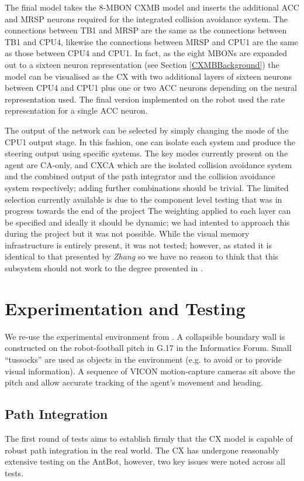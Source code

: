 \documentclass[a4paper,11pt,twoside,openright]{article}
\let\oldsection\section
\def\section{\cleardoublepage\oldsection}
\begin{document}
The final model takes the 8-MBON CXMB model and inserts the additional ACC and
MRSP neurons required for the integrated collision avoidance system. The
connections between TB1 and MRSP are the same as the connections between TB1
and CPU4, likewise the connections between MRSP and CPU1 are the same as those
between CPU4 and CPU1. In fact, as the eight MBONs are expanded out to a
sixteen neuron representation (see Section \ref{CXMBBackground}) the
model can be visualised as the CX with two additional layers of sixteen neurons
between CPU4 and CPU1 plus one or two ACC neurons depending on the neural
representation used. The final version implemented on the robot used the rate
representation for a single ACC neuron.
\newline\par

The output of the network can be selected by simply changing the mode of the
CPU1 output stage. In this fashion, one can isolate each system and produce
the steering output using specific systems. The key modes currently present on
the agent are CA-only, and CXCA which are the isolated collision avoidance system
and the combined output of the path integrator and the collision avoidance
system respectively; adding further combinations should be trivial. The limited
selection currently available is due to the component level testing that
was in progress towards the end of the project The weighting applied to each
layer can be specified and ideally it should be dynamic; we had intented to
approach this during the project but it was not possible. While the visual
memory infrastructure is entirely present, it was not tested; however, as stated
it is identical to that presented by \textit{Zhang} so we have no reason to
think that this subsystem should not work to the degree presented in
\cite{Zhang2017}.

\section{Experimentation and Testing}\label{sec:test}
We re-use the experimental environment from \cite{Mitchell2018}. A collapsible
boundary wall is constructed on the robot-football pitch in G.17 in the
Informatics Forum. Small ``tussocks'' are used as objects in the environment
(e.g. to avoid or to provide visual information). A sequence of VICON
motion-capture cameras sit above the pitch and allow accurate tracking
of the agent's movement and heading.

\subsection{Path Integration}
The first round of tests aims to establish firmly that the CX model is capable of
robust path integration in the real world. The CX has undergone reasonably
extensive testing on the AntBot, however, two key issues were noted across all
tests.
\end{document}
